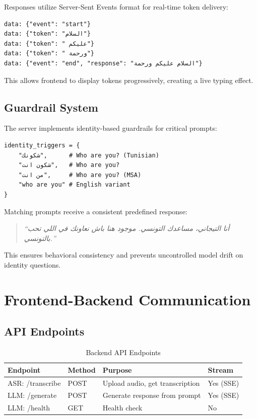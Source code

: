 \documentclass[12pt,a4paper]{report}
\begin{document}
Responses utilize Server-Sent Events format for real-time token delivery:

\begin{verbatim}
data: {"event": "start"}
data: {"token": "السلام"}
data: {"token": " عليكم"}
data: {"token": " ورحمة"}
data: {"event": "end", "response": "السلام عليكم ورحمة"}
\end{verbatim}

This allows frontend to display tokens progressively, creating a live typing effect.

\subsection{Guardrail System}

The server implements identity-based guardrails for critical prompts:

\begin{verbatim}
identity_triggers = {
    "شكونك",      # Who are you? (Tunisian)
    "شكون انت",   # Who are you?
    "من انت",     # Who are you? (MSA)
    "who are you" # English variant
}
\end{verbatim}

Matching prompts receive a consistent predefined response:
\begin{quote}
\textit{``أنا التيجاني، مساعدك التونسي. موجود هنا باش نعاونك في اللي تحب بالتونسي.''}
\end{quote}

This ensures behavioral consistency and prevents uncontrolled model drift on identity questions.

\section{Frontend-Backend Communication}

\subsection{API Endpoints}

\begin{table}[H]
\centering
\begin{tabular}{|l|l|l|l|}
\hline
\textbf{Endpoint} & \textbf{Method} & \textbf{Purpose} & \textbf{Stream} \\
\hline
ASR: /transcribe & POST & Upload audio, get transcription & Yes (SSE) \\
LLM: /generate & POST & Generate response from prompt & Yes (SSE) \\
LLM: /health & GET & Health check & No \\
\hline
\end{tabular}
\caption{Backend API Endpoints}
\label{tab:api_endpoints}
\end{table}
\end{document}
